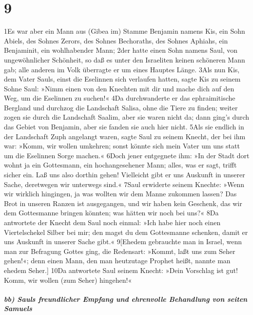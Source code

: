 \hypertarget{section-8}{%
\section{9}\label{section-8}}

1Es war aber ein Mann aus (Gibea im) Stamme Benjamin namens Kis, ein
Sohn Abiels, des Sohnes Zerors, des Sohnes Bechoraths, des Sohnes
Aphiahs, ein Benjaminit, ein wohlhabender Mann; 2der hatte einen Sohn
namens Saul, von ungewöhnlicher Schönheit, so daß es unter den
Israeliten keinen schöneren Mann gab; alle anderen im Volk überragte er
um eines Hauptes Länge. 3Als nun Kis, dem Vater Sauls, einst die
Eselinnen sich verlaufen hatten, sagte Kis zu seinem Sohne Saul: »Nimm
einen von den Knechten mit dir und mache dich auf den Weg, um die
Eselinnen zu suchen!« 4Da durchwanderte er das ephraimitische Bergland
und durchzog die Landschaft Salisa, ohne die Tiere zu finden; weiter
zogen sie durch die Landschaft Saalim, aber sie waren nicht da; dann
ging's durch das Gebiet von Benjamin, aber sie fanden sie auch hier
nicht. 5Als sie endlich in der Landschaft Zuph angelangt waren, sagte
Saul zu seinem Knecht, der bei ihm war: »Komm, wir wollen umkehren;
sonst könnte sich mein Vater um uns statt um die Eselinnen Sorge
machen.« 6Doch jener entgegnete ihm: »In der Stadt dort wohnt ja ein
Gottesmann, ein hochangesehener Mann; alles, was er sagt, trifft sicher
ein. Laß uns also dorthin gehen! Vielleicht gibt er uns Auskunft in
unserer Sache, deretwegen wir unterwegs sind.« 7Saul erwiderte seinem
Knechte: »Wenn wir wirklich hingingen, ja was wollten wir dem Manne
zukommen lassen? Das Brot in unseren Ranzen ist ausgegangen, und wir
haben kein Geschenk, das wir dem Gottesmanne bringen könnten; was hätten
wir noch bei uns?« 8Da antwortete der Knecht dem Saul noch einmal: »Ich
habe hier noch einen Viertelschekel Silber bei mir; den magst du dem
Gottesmanne schenken, damit er uns Auskunft in unserer Sache gibt.«
9{[}Ehedem gebrauchte man in Israel, wenn man zur Befragung Gottes ging,
die Redensart: »Kommt, laßt uns zum Seher gehen!«; denn einen Mann, den
man heutzutage Prophet heißt, nannte man ehedem Seher.{]} 10Da
antwortete Saul seinem Knecht: »Dein Vorschlag ist gut! Komm, wir wollen
(zum Seher) hingehen!«

\hypertarget{bb-sauls-freundlicher-empfang-und-ehrenvolle-behandlung-von-seiten-samuels}{%
\subparagraph{bb) Sauls freundlicher Empfang und ehrenvolle Behandlung
von seiten
Samuels}\label{bb-sauls-freundlicher-empfang-und-ehrenvolle-behandlung-von-seiten-samuels}}

